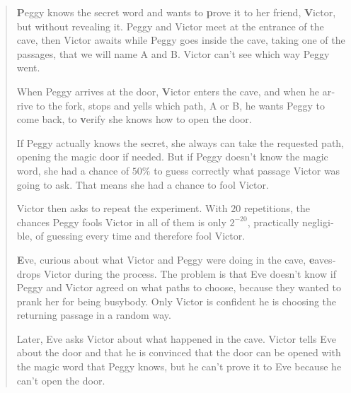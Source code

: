 \begin{otherlanguage}{english}
\begin{quote}
	\textbf{P}eggy knows the secret word and wants to \textbf{p}rove it to her friend, \textbf{V}ictor, but without revealing it.
	Peggy and Victor meet at the entrance of the cave, then Victor awaits while Peggy goes inside the cave, taking one of the passages, that we will name A and B. Victor can't see which way Peggy went. 
	
	When Peggy arrives at the door, \textbf{V}ictor enters the cave, and when he arrive to the fork, stops and yells which path, A or B, he wants Peggy to come back, to \textbf{v}erify she knows how to open the door.
		
	If Peggy actually knows the secret, she always can take the requested path, opening the magic door if needed.
	But if Peggy doesn't know the magic word, she had a chance of $50\%$ to guess correctly what passage Victor was going to ask. That means she had a chance to fool Victor.
	
	Victor then asks to repeat the experiment. With $20$ repetitions, the chances Peggy fools Victor in all of them is only  $2^{-20}$, practically negligible, of guessing every time and therefore fool Victor.
	
	\textbf{E}ve, curious about what Victor and Peggy were doing in the cave, \textbf{e}avesdrops Victor during the process. The problem is that Eve doesn't know if Peggy and Victor agreed on what paths to choose, because they wanted to prank her for being busybody. Only Victor is confident he is choosing the returning passage in a random way.
	
	Later, Eve asks Victor about what happened in the cave. Victor tells Eve about the door and that he is convinced that the door can be opened with the magic word that Peggy knows, but he can't prove it to Eve because he can't open the door. 
\end{quote}



\end{otherlanguage}
